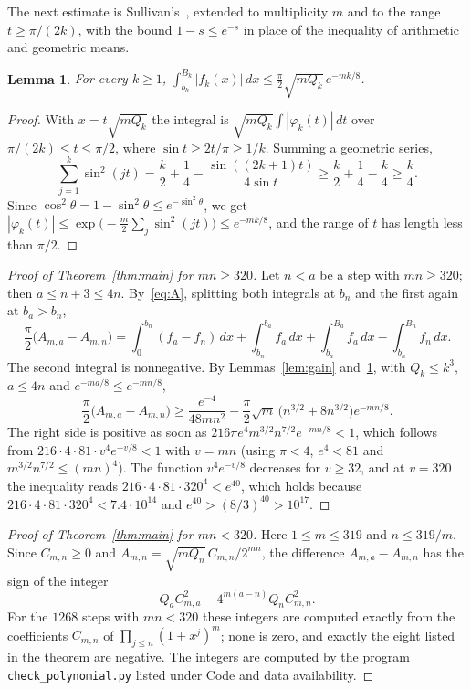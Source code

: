 \documentclass[11pt]{article}
\newtheorem{lemma}[theorem]{Lemma}
\theoremstyle{remark}
\begin{document}
The next estimate is Sullivan's~\cite[Lemma~2, Case~3]{Sul13}, extended to multiplicity $m$ and to the range $t\ge\pi/(2k)$, with the bound $1-s\le e^{-s}$ in place of the inequality of arithmetic and geometric means.

\begin{lemma}\label{lem:tail}
For every $k\ge1$, $\int_{b_k}^{B_k}|f_k(x)|\,dx\le\frac\pi2\sqrt{mQ_k}\,e^{-mk/8}$.
\end{lemma}

\begin{proof}
With $x=t\sqrt{mQ_k}$ the integral is $\sqrt{mQ_k}\int|\varphi_k(t)|\,dt$ over $\pi/(2k)\le t\le\pi/2$, where $\sin t\ge2t/\pi\ge1/k$. Summing a geometric series,
\[
\sum_{j=1}^k\sin^2(jt)=\frac k2+\frac14-\frac{\sin((2k+1)t)}{4\sin t}\ge\frac k2+\frac14-\frac k4\ge\frac k4 .
\]
Since $\cos^2\theta=1-\sin^2\theta\le e^{-\sin^2\theta}$, we get $|\varphi_k(t)|\le\exp\bigl(-\frac m2\sum_j\sin^2(jt)\bigr)\le e^{-mk/8}$, and the range of $t$ has length less than $\pi/2$.
\end{proof}

\begin{proof}[Proof of Theorem~\ref{thm:main} for $mn\ge320$]
Let $n<a$ be a step with $mn\ge320$; then $a\le n+3\le4n$. By~\eqref{eq:A}, splitting both integrals at $b_n$ and the first again at $b_a>b_n$,
\[
\frac\pi2\bigl(A_{m,a}-A_{m,n}\bigr)=\int_0^{b_n}(f_a-f_n)\,dx+\int_{b_n}^{b_a}f_a\,dx+\int_{b_a}^{B_a}f_a\,dx-\int_{b_n}^{B_n}f_n\,dx .
\]
The second integral is nonnegative. By Lemmas~\ref{lem:gain} and~\ref{lem:tail}, with $Q_k\le k^3$, $a\le4n$ and $e^{-ma/8}\le e^{-mn/8}$,
\[
\frac\pi2\bigl(A_{m,a}-A_{m,n}\bigr)\ge\frac{e^{-4}}{48mn^2}-\frac\pi2\sqrt m\,\bigl(n^{3/2}+8n^{3/2}\bigr)e^{-mn/8}.
\]
The right side is positive as soon as $216\pi e^4m^{3/2}n^{7/2}e^{-mn/8}<1$, which follows from $216\cdot4\cdot81\cdot v^4e^{-v/8}<1$ with $v=mn$ (using $\pi<4$, $e^4<81$ and $m^{3/2}n^{7/2}\le(mn)^4$). The function $v^4e^{-v/8}$ decreases for $v\ge32$, and at $v=320$ the inequality reads $216\cdot4\cdot81\cdot320^4<e^{40}$, which holds because $216\cdot4\cdot81\cdot320^4<7.4\cdot10^{14}$ and $e^{40}>(8/3)^{40}>10^{17}$.
\end{proof}

\begin{proof}[Proof of Theorem~\ref{thm:main} for $mn<320$]
Here $1\le m\le319$ and $n\le319/m$. Since $C_{m,n}\ge0$ and $A_{m,n}=\sqrt{mQ_n}\,C_{m,n}/2^{mn}$, the difference $A_{m,a}-A_{m,n}$ has the sign of the integer
\[
Q_aC_{m,a}^2-4^{m(a-n)}Q_nC_{m,n}^2 .
\]
For the $1268$ steps with $mn<320$ these integers are computed exactly from the coefficients $C_{m,n}$ of $\prod_{j\le n}(1+x^j)^m$; none is zero, and exactly the eight listed in the theorem are negative. The integers are computed by the program \texttt{check\_polynomial.py} listed under Code and data availability.
\end{proof}
\end{document}

